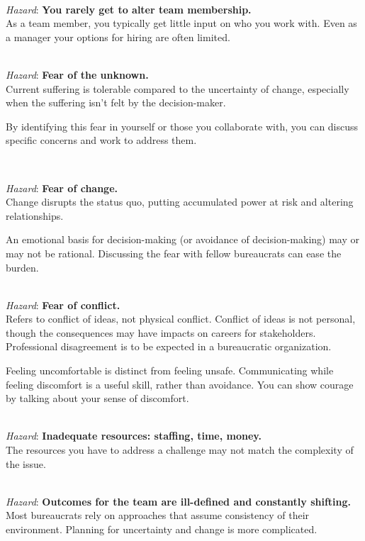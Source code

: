 \ \\
\textit{Hazard}: \textbf{You rarely get to alter team membership.}\\
As a team member, you typically get little input on who you work with. Even as a manager your options for hiring are often limited. 

\ \\
\textit{Hazard}: \textbf{Fear of the unknown.}\\
Current suffering is tolerable compared to the uncertainty of change, especially when the suffering isn't felt by the decision-maker.

By identifying this fear in yourself or those you collaborate with, you can discuss specific concerns and work to address them.

\ \\
\begin{samepage}
\textit{Hazard}: \textbf{Fear of change.} \\
Change disrupts the status quo, putting accumulated power at risk and altering relationships. 
\end{samepage}

An emotional basis for decision-making (or avoidance of decision-making) may or may not be rational. Discussing the fear with fellow bureaucrats can ease the burden. 

\ \\
\textit{Hazard}: \textbf{Fear of conflict.}\\
Refers to conflict of ideas, not physical conflict. Conflict of ideas is not personal, though the consequences may have impacts on careers for stakeholders. \\
Professional disagreement is to be expected in a bureaucratic organization.

Feeling uncomfortable is distinct from feeling unsafe. Communicating while feeling discomfort is a useful skill, rather than avoidance. You can show courage by talking about your sense of discomfort. 

\ \\
\textit{Hazard}: \textbf{Inadequate resources: staffing, time, money.}\\
The resources you have to address a challenge may not match the complexity of the issue.

\ \\
\textit{Hazard}: \textbf{Outcomes for the team are ill-defined and constantly shifting.}\\
Most bureaucrats rely on approaches that assume consistency of their environment. Planning for uncertainty and change is more complicated.

